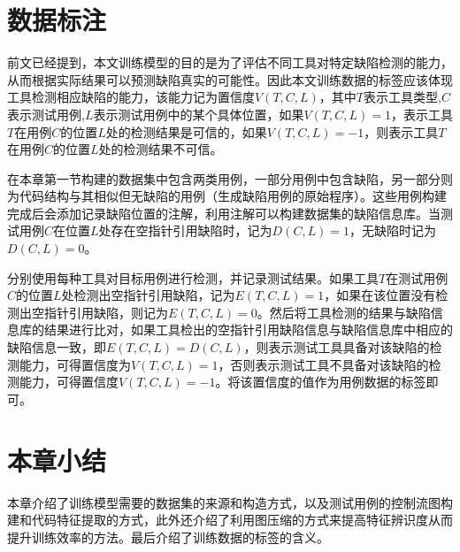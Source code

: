 \section{数据标注}
前文已经提到，本文训练模型的目的是为了评估不同工具对特定缺陷检测的能力，从而根据实际结果可以预测缺陷真实的可能性。因此本文训练数据的标签应该体现工具检测相应缺陷的能力，该能力记为置信度$V(T,C,L)$，其中$T$表示工具类型,$C$表示测试用例,$L$表示测试用例中的某个具体位置，如果$V(T,C,L)=1$，表示工具$T$在用例$C$的位置$L$处的检测结果是可信的，如果$V(T,C,L)=-1$，则表示工具$T$在用例$C$的位置$L$处的检测结果不可信。

在本章第一节构建的数据集中包含两类用例，一部分用例中包含缺陷，另一部分则为代码结构与其相似但无缺陷的用例（生成缺陷用例的原始程序）。这些用例构建完成后会添加记录缺陷位置的注解，利用注解可以构建数据集的缺陷信息库。当测试用例$C$在位置$L$处存在空指针引用缺陷时，记为$D(C,L)=1$，无缺陷时记为$D(C,L)=0$。

分别使用每种工具对目标用例进行检测，并记录测试结果。如果工具$T$在测试用例$C$的位置$L$处检测出空指针引用缺陷，记为$E(T,C,L)=1$，如果在该位置没有检测出空指针引用缺陷，则记为$E(T,C,L)=0$。然后将工具检测的结果与缺陷信息库的结果进行比对，如果工具检出的空指针引用缺陷信息与缺陷信息库中相应的缺陷信息一致，即$E(T,C,L)=D(C,L)$，则表示测试工具具备对该缺陷的检测能力，可得置信度为$V(T,C,L)=1$，否则表示测试工具不具备对该缺陷的检测能力，可得置信度$V(T,C,L)=-1$。将该置信度的值作为用例数据的标签即可。

\section{本章小结}

本章介绍了训练模型需要的数据集的来源和构造方式，以及测试用例的控制流图构建和代码特征提取的方式，此外还介绍了利用图压缩的方式来提高特征辨识度从而提升训练效率的方法。最后介绍了训练数据的标签的含义。